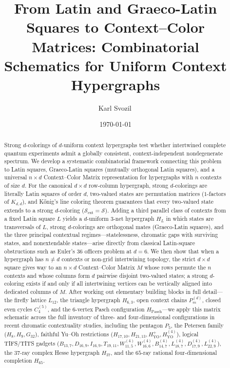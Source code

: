 \documentclass[aps,pra,reprint,superscriptaddress,longbibliography,nofootinbib,floatfix,10pt]{revtex4-2}
\theoremstyle{definition}\newtheorem{definition}[theorem]{Definition}
\theoremstyle{remark}\newtheorem{remark}[theorem]{Remark}
\begin{document}
\title{From Latin and Graeco-Latin Squares to Context--Color Matrices: Combinatorial Schematics for Uniform Context Hypergraphs}

\author{Karl Svozil\,}

\date{\today}

\begin{abstract}
Strong $d$-colorings of $d$-uniform context hypergraphs test whether intertwined complete quantum experiments admit a globally consistent, context-independent nondegenerate spectrum. We develop a systematic combinatorial framework connecting this problem to Latin squares, Graeco-Latin squares (mutually orthogonal Latin squares), and a universal $n\times d$ Context--Color Matrix representation for hypergraphs with $n$ contexts of size $d$. For the canonical $d\times d$ row-column hypergraph, strong $d$-colorings are literally Latin squares of order $d$, two-valued states are permutation matrices ($1$-factors of $K_{d,d}$), and K\H{o}nig's line coloring theorem guarantees that every two-valued state extends to a strong $d$-coloring ($\mathcal{S}_{\mathrm{ext}}=\mathcal{S}$). Adding a third parallel class of contexts from a fixed Latin square $L$ yields a $d$-uniform $3$-net hypergraph $H_L$ in which states are transversals of $L$, strong $d$-colorings are orthogonal mates (Graeco-Latin squares), and the three principal contextual regimes—statelessness, chromatic gaps with surviving states, and nonextendable states—arise directly from classical Latin-square obstructions such as Euler's $36$ officers problem at $d=6$. We then show that when a hypergraph has $n\neq d$ contexts or non-grid intertwining topology, the strict $d\times d$ square gives way to an $n\times d$ Context--Color Matrix $M$ whose rows permute the $n$ contexts and whose columns form $d$ pairwise disjoint two-valued states; a strong $d$-coloring exists if and only if all intertwining vertices can be vertically aligned into dedicated columns of $M$. After working out elementary building blocks in full detail—the firefly lattice $L_{12}$, the triangle hypergraph $H_{6,3}$, open context chains $P_m^{(d)}$, closed even cycles $C_4^{(5)}$, and the $6$-vertex Pasch configuration $H_{\mathrm{Pasch}}$—we apply this matrix schematic across the full inventory of three- and four-dimensional configurations in recent chromatic contextuality studies, including the pentagon $P_5$, the Petersen family ($H_8,H_9,G_{32}$), faithful Yu--Oh restrictions ($H_{17,10},H_{21,13},H_{\mathrm{YO}}^+,H_{\mathrm{YO}}^{(4)}$), logical TIFS/TITS gadgets ($B_{13,7},D_{16,9},I_{16,9},T_{19,11},W_{11,5}^{(4)},W_{16,6}^{(4)},B_{14,7}^{(4)},L_{18,7}^{(4)},D_{17,9}^{(4)},L_{22,9}^{(4)}$), the $37$-ray complex Hesse hypergraph $H_{37}$, and the $65$-ray rational four-dimensional completion $H_{65}$.
\end{abstract}
\end{document}
